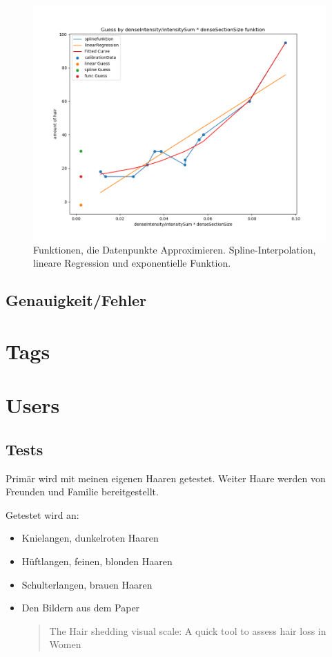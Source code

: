 \documentclass[german,a4paper,12pt]{llncs}
\begin{document}
\begin{figure}
	\centering
	\includegraphics[width=1.2\textwidth]{fig64/g11_denseIntensitynorm.png}
	\caption[]{Funktionen, die Datenpunkte Approximieren. Spline-Interpolation, lineare Regression und exponentielle Funktion.}
	\label{fig:func}
\end{figure} 



\subsection{Genauigkeit/Fehler}


\section{Tags}
\section{Users}

\subsection{Tests}

Primär wird mit meinen eigenen Haaren getestet. Weiter Haare werden von Freunden und Familie bereitgestellt.

Getestet wird an:
\begin{itemize}
	\item Knielangen, dunkelroten Haaren
	\item Hüftlangen, feinen, blonden Haaren
	\item Schulterlangen, brauen Haaren
	\item Den Bildern aus dem Paper \blockquote{The Hair shedding visual scale: A quick tool to assess hair loss in Women} 
\end{itemize}
\end{document}
